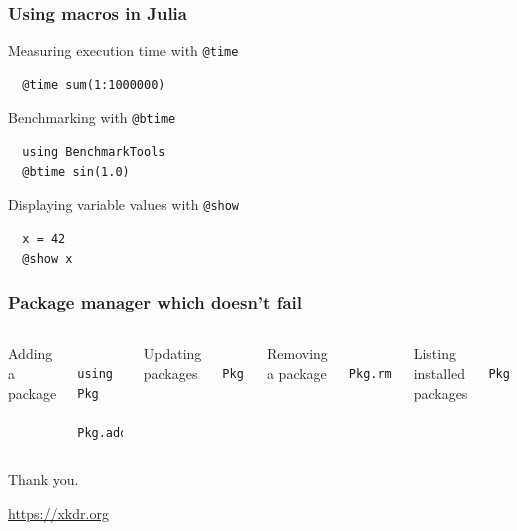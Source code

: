 \documentclass[aspectratio=169]{beamer} %
\begin{document}
\begin{frame}[fragile]
  \frametitle{Using macros in Julia}

  Measuring execution time with \verb|@time|
  \begin{verbatim}
  @time sum(1:1000000)
  \end{verbatim}

  Benchmarking with \verb|@btime|
  \begin{verbatim}
  using BenchmarkTools
  @btime sin(1.0)
  \end{verbatim}

  Displaying variable values with \verb|@show|
  \begin{verbatim}
  x = 42
  @show x
  \end{verbatim}

\end{frame}


\begin{frame}[fragile]
  \frametitle{Package manager which doesn't fail}
  \vspace{0.5cm}  
  \begin{columns}[t]
  Adding a package
  \begin{verbatim}
  using Pkg
  Pkg.add("ExamplePackage")
  \end{verbatim}
  Updating packages
  \begin{verbatim}
  Pkg.update()
  \end{verbatim}
  Removing a package
  \begin{verbatim}
  Pkg.rm("ExamplePackage")
  \end{verbatim}
  Listing installed packages
  \begin{verbatim}
  Pkg.status()
  \end{verbatim}
  \end{columns}
\end{frame} 


\begin{frame}
  \hfill {\LARGE Thank you}.

  \vfill
  \vfill

  \hfill \url{https://xkdr.org}
\end{frame}
\end{document}
